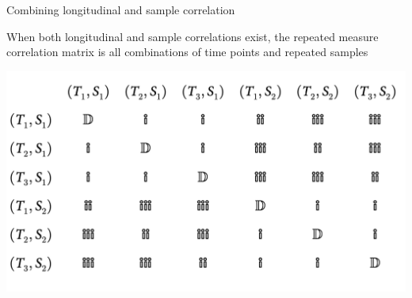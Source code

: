 \documentclass{beamer}
\begin{document}
\begin{frame}[t]{Combining longitudinal and sample correlation}

When both longitudinal and sample correlations exist, the repeated measure correlation matrix is all combinations of time points and repeated samples

  \includegraphics[width = \textwidth]{longitudinal_sample.png}

\end{frame}
\end{document}
